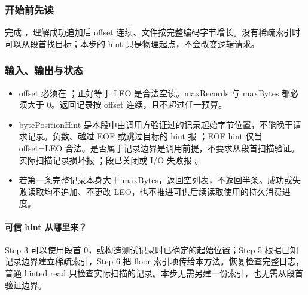 \subsubsection*{开始前先读}
完成 ，理解成功追加后 offset 连续、文件按完整编码字节增长。没有稀疏索引时可以从段首找目标；本步的 hint 只是物理起点，不会改变逻辑请求。
\subsubsection*{输入、输出与状态}
\begin{itemize}
\item offset 必须在 ；正好等于 LEO 是合法空读。maxRecords 与 maxBytes 都必须大于 0。返回记录按 offset 连续，且不超过任一预算。
\item bytePositionHint 是本段中由调用方验证过的记录起始字节位置，不能晚于请求记录。负数、越过 EOF 或跳过目标的 hint 报 ；EOF hint 仅当 offset=LEO 合法。是否属于记录边界是调用前提，不要求从段首扫描验证。实际扫描记录损坏报 ；段已关闭或 I/O 失败报 。
\item 若第一条完整记录本身大于 maxBytes，返回空列表，不返回半条。成功或失败读取均不追加、不更改 LEO，也不推进可供后续读取使用的持久消费进度。
\end{itemize}
\paragraph{可信 hint 从哪里来？}Step 3 可以使用段首 0，或构造测试记录时已确定的起始位置；Step 5 根据已知记录边界建立稀疏索引，Step 6 把 floor 索引项传给本方法。恢复检查完整日志，普通 hinted read 只检查实际扫描的记录。本步无需另建一份索引，也无需从段首验证边界。
